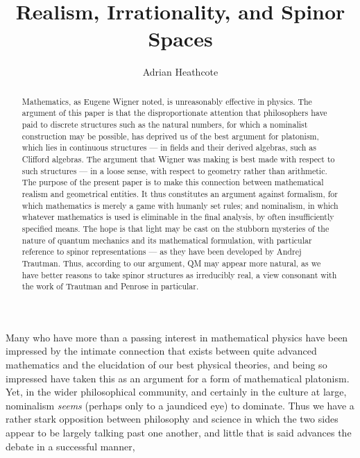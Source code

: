 \documentclass[11pt,oneside,a4paper]{article}
\begin{document}
                                                                                   

\title{Realism, Irrationality, and Spinor Spaces} 
\author{Adrian Heathcote}  


\maketitle

\begin{abstract}\noindent
Mathematics, as Eugene Wigner noted, is unreasonably effective in physics. The argument of this paper is that the disproportionate attention that philosophers have paid to discrete structures such as the natural numbers, for which a nominalist construction may be possible, has deprived us of the best argument for platonism, which lies in continuous structures --- in fields and their derived algebras, such as Clifford algebras. The argument that Wigner was making is best made with respect to such structures --- in a loose sense, with respect to geometry rather than arithmetic. The purpose of the present paper is to make this connection between mathematical realism and geometrical entities. It thus constitutes an argument against formalism, for which mathematics is merely a game with humanly set rules; and nominalism, in which whatever mathematics is used is eliminable in the final analysis, by often insufficiently specified means. The hope is that light may be cast on the stubborn mysteries of the nature of quantum mechanics and its mathematical formulation, with particular reference to spinor representations --- as they have been developed by Andrej Trautman. Thus, according to our argument, QM may appear more natural, as we have better reasons to take spinor structures as irreducibly real, a view consonant with the work of Trautman and Penrose in particular.
\end{abstract}



\noindent
Many who have more than a passing interest in mathematical physics have been impressed by the intimate connection that exists between quite advanced mathematics and the elucidation of our best physical theories, and being so impressed have taken this as an argument for a form of mathematical platonism. Yet, in the wider philosophical community, and certainly in the culture at large, nominalism \textit{seems} (perhaps only to a jaundiced eye) to dominate. Thus we have a rather stark opposition between philosophy and science in which the two sides appear to be largely talking past one another, and little that is said advances the debate in a successful manner,
\end{document}

